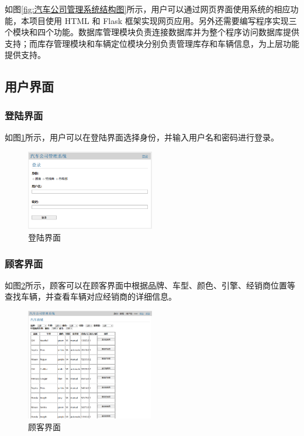 \documentclass[hyperref,a4paper,UTF8]{ctexart}
\begin{document}
如图\ref{fig:汽车公司管理系统结构图}所示，用户可以通过网页界面使用系统的相应功能，本项目使用 HTML 和 Flask 框架实现网页应用。另外还需要编写程序实现三个模块和四个功能。数据库管理模块负责连接数据库并为整个程序访问数据库提供支持；而库存管理模块和车辆定位模块分别负责管理库存和车辆信息，为上层功能提供支持。

\subsection{用户界面}

\subsubsection{登陆界面}

如图\ref{fig:登陆界面}所示，用户可以在登陆界面选择身份，并输入用户名和密码进行登录。

\begin{figure}[h]
    \centering
    \includegraphics[width=0.5\textwidth]{figures/登陆界面.png}
    \caption{登陆界面}
    \label{fig:登陆界面}
\end{figure}

\subsubsection{顾客界面}

如图\ref{fig:顾客界面}所示，顾客可以在顾客界面中根据品牌、车型、颜色、引擎、经销商位置等查找车辆，并查看车辆对应经销商的详细信息。

\begin{figure}[h]
    \centering
    \includegraphics[width=0.5\textwidth]{figures/顾客界面.png}
    \caption{顾客界面}
    \label{fig:顾客界面}
\end{figure}
\end{document}
